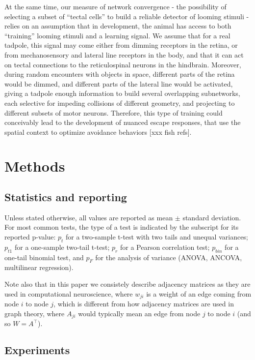 \documentclass{article}
\begin{document}
At the same time, our measure of network convergence - the possibility of selecting a subset of “tectal cells” to build a reliable detector of looming stimuli - relies on an assumption that in development, the animal has access to both “training” looming stimuli and a learning signal. We assume that for a real tadpole, this signal may come either from dimming receptors in the retina, or from mechanosensory and lateral line receptors in the body, and that it can act on tectal connections to the reticulospinal neurons in the hindbrain. Moreover, during random encounters with objects in space, different parts of the retina would be dimmed, and different parts of the lateral line would be activated, giving a tadpole enough information to build several overlapping subnetworks, each selective for impeding collisions of different geometry, and projecting to different subsets of motor neurons. Therefore, this type of training could conceivably lead to the development of nuanced escape responses, that use the spatial context to optimize avoidance behaviors \citep{khakhalin2014}[xxx fish refs].

\section*{Methods}

\subsection*{Statistics and reporting}

Unless stated otherwise, all values are reported as mean $\pm$ standard deviation. For most common tests, the type of a test is indicated by the subscript for its reported p-value: $p_t$ for a two-sample t-test with two tails and unequal variances; $p_{t1}$ for a one-sample two-tail t-test; $p_r$ for a Pearson correlation test; $p_{bin}$ for a one-tail binomial test, and $p_F$ for the analysis of variance (ANOVA, ANCOVA, multilinear regression).

Note also that in this paper we consistely describe adjacency matrices as they are used in computational neuroscience, where $w_{ji}$ is a weight of an edge coming from node $i$ to node $j$, which is different from how adjacency matrices are used in graph theory, where $A_{ji}$ would typically mean an edge from node $j$ to node $i$ (and so $W = A^\top$).

\subsection*{Experiments}
\end{document}

